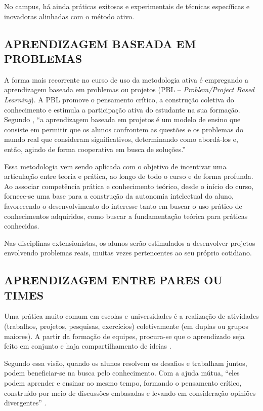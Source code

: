 No campus, há ainda práticas exitosas e experimentais de técnicas específicas e inovadoras alinhadas com o método ativo.

\subsection{APRENDIZAGEM BASEADA EM PROBLEMAS}


A forma mais recorrente no curso de uso da metodologia ativa é empregando a aprendizagem baseada em problemas ou projetos (PBL – \textit{Problem/Project Based Learning}). A PBL promove o pensamento crítico, a construção coletiva do conhecimento e estimula a participação ativa do estudante na sua formação. Segundo , “a aprendizagem baseada em projetos é um modelo de ensino que consiste em permitir que os alunos confrontem as questões e os problemas do mundo real que consideram significativos, determinando como abordá-los e, então, agindo de forma cooperativa em busca de soluções.”

Essa metodologia vem sendo aplicada com o objetivo de incentivar uma articulação entre teoria e prática, ao longo de todo o curso e de forma profunda. Ao associar competência prática e conhecimento teórico, desde o início do curso, fornece-se uma base para a construção da autonomia intelectual do aluno, favorecendo o desenvolvimento do interesse tanto em buscar o uso prático de conhecimentos adquiridos, como buscar a fundamentação teórica para práticas conhecidas.

Nas disciplinas extensionistas, os alunos serão estimulados a desenvolver projetos envolvendo problemas reais, muitas vezes pertencentes ao seu próprio cotidiano.

\subsection{APRENDIZAGEM ENTRE PARES OU TIMES}


Uma prática muito comum em escolas e universidades é a realização de atividades (trabalhos, projetos, pesquisas, exercícios) coletivamente (em duplas ou grupos maiores). A partir da formação de equipes, procura-se que o aprendizado seja feito em conjunto e haja compartilhamento de ideias \cite{lyceum2017metodologias}.

Segundo essa visão, quando os alunos resolvem os desafios e trabalham juntos, podem beneficiar-se na busca pelo conhecimento. Com a ajuda mútua, “eles podem aprender e ensinar ao mesmo tempo, formando o pensamento crítico, construído por meio de discussões embasadas e levando em consideração opiniões divergentes” \cite{lyceum2017metodologias}.


